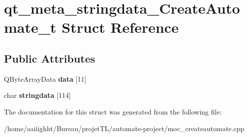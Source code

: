 \hypertarget{structqt__meta__stringdata___create_automate__t}{\section{qt\-\_\-meta\-\_\-stringdata\-\_\-\-Create\-Automate\-\_\-t Struct Reference}
\label{structqt__meta__stringdata___create_automate__t}
}
\subsection*{Public Attributes}
\begin{DoxyCompactItemize}
\item 
\hypertarget{structqt__meta__stringdata___create_automate__t_ae92019b6c4e246f6ca8e54a88cb14939}{Q\-Byte\-Array\-Data {\bfseries data} \mbox{[}11\mbox{]}}\label{structqt__meta__stringdata___create_automate__t_ae92019b6c4e246f6ca8e54a88cb14939}

\item 
\hypertarget{structqt__meta__stringdata___create_automate__t_a37c3e697ec6a0ea69bba8c75a2d9a368}{char {\bfseries stringdata} \mbox{[}114\mbox{]}}\label{structqt__meta__stringdata___create_automate__t_a37c3e697ec6a0ea69bba8c75a2d9a368}

\end{DoxyCompactItemize}


The documentation for this struct was generated from the following file\-:\begin{DoxyCompactItemize}
\item 
/home/aaiiighht/\-Bureau/projet\-T\-L/automate-\/project/moc\-\_\-createautomate.\-cpp\end{DoxyCompactItemize}
